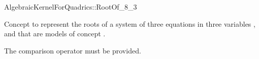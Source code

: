 \begin{ccRefConcept}{AlgebraicKernelForQuadrics::RootOf_8_3}

\ccDefinition

Concept to represent the roots of a system of three equations 
in three variables ,  and  that are models of concept
.

\ccOperations

The comparison operator \ccc{==} must be provided. 


\ccHasModels


\ccSeeAlso


\end{ccRefConcept}

